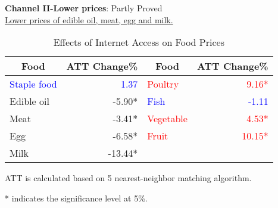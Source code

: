 \documentclass{beamer}	%
\theoremstyle{plain}
\theoremstyle{definition}
\theoremstyle{remark}
\numberwithin{equation}{section}
\begin{document}
\begin{frame}
	\textbf{Channel II-Lower prices}: Partly Proved \\
	\underline{Lower prices of edible oil, meat, egg and milk.} \\
	\centering
	\begin{table}[]
		\caption{Effects of Internet Access on Food Prices}
		\begin{tabular}{lrlr}
			\hline
			\multicolumn{1}{c}{Food} & \multicolumn{1}{c}{ATT Change\%} & \multicolumn{1}{c}{Food} & \multicolumn{1}{c}{ATT Change\%}  \\
			\hline
			\textcolor{blue}{Staple food} & \textcolor{blue}{1.37}    & \textcolor{red}{Poultry}   & \textcolor{red}{9.16*}  \\
			Edible oil  & -5.90*  & \textcolor{blue}{Fish}      & \textcolor{blue}{-1.11}  \\
			Meat        & -3.41*  & \textcolor{red}{Vegetable} & \textcolor{red}{4.53*}  \\
			Egg         & -6.58*  & \textcolor{red}{Fruit}     & \textcolor{red}{10.15*} \\
			Milk        & -13.44* &           &        \\
			\hline
		\end{tabular}%
		\begin{tablenotes}
			\item \tiny{ATT is calculated based on 5 nearest-neighbor matching algorithm.}
			\item \tiny{* indicates the significance level at 5\%.}
		\end{tablenotes}		
	\end{table}
\end{frame}
\end{document}
